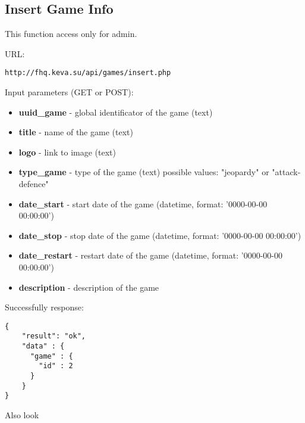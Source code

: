 \subsection{Insert Game Info}
\par

This function access only for admin.

URL:
\begin{Verbatim}[frame=single]
http://fhq.keva.su/api/games/insert.php
\end{Verbatim}

Input parameters (GET or POST):
\begin{itemize}
  \item \textbf{uuid\_game} - global identificator of the game (text)
  \item \textbf{title} - name of the game (text)
  \item \textbf{logo} - link to image (text)
  \item \textbf{type\_game} - type of the game (text) possible values: "jeopardy" or "attack-defence"
  \item \textbf{date\_start} - start date of the game (datetime, format:  '0000-00-00 00:00:00')
  \item \textbf{date\_stop} - stop date of the game (datetime, format:  '0000-00-00 00:00:00')
  \item \textbf{date\_restart} - restart date of the game (datetime, format:  '0000-00-00 00:00:00')
  \item \textbf{description} - description of the game
\end{itemize}

Successfully response:  \\
\begin{Verbatim}[frame=single]
{
    "result": "ok",
    "data" : {
      "game" : {
        "id" : 2
      }
    }
}
\end{Verbatim}

Also look ~
